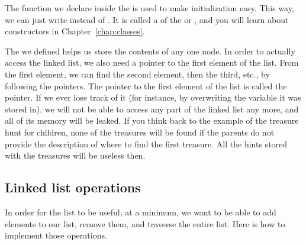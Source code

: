 The function  we declare inside the  is used
to make initialization easy.
This way, we can just write 
instead of
.
It is called a  of the  or ,
and you will learn about constructors in Chapter~\ref{chap:classes}.

The  we defined helps us store the contents of any
one node.
In order to actually access the linked list, we also need a pointer to
the first element of the list.
From the first element, we can find the second element, then the third,
etc., by following the  pointers.
The pointer to the first element of the list is called the 
pointer.
If we ever lose track of it (for instance, by overwriting the variable
it was stored in),
we will not be able to access any part of the linked list any more,
and all of its memory will be leaked.
If you think back to the example of the treasure hunt for children,
none of the treasures will be found if the parents do not provide the
description of where to find the first treasure.
All the hints stored with the treasures will be useless then.

\subsection{Linked list operations}
In order for the list to be useful, at a minimum,
we want to be able to add elements to our list,
remove them, and traverse the entire list.
Here is how to implement those operations.

